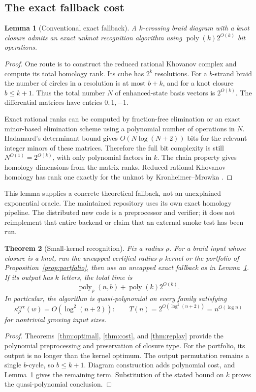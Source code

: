 \documentclass[11pt,a4paper]{article}
\newtheorem{theorem}{Theorem}[section]
\newtheorem{lemma}[theorem]{Lemma}
\theoremstyle{definition}\newtheorem{definition}[theorem]{Definition}
\theoremstyle{remark}\newtheorem{remark}[theorem]{Remark}
\newcommand{\kc}[1]{\kappa^{\mathrm{cyc}}_{#1}}
\begin{document}
\subsection{The exact fallback cost}
\begin{lemma}[Conventional exact fallback]\label{lem:fallback}
A $k$-crossing braid diagram with a knot closure admits an exact unknot
recognition algorithm using $\operatorname{poly}(k)2^{O(k)}$ bit operations.
\end{lemma}
\begin{proof}
One route is to construct the reduced rational Khovanov complex and compute
its total homology rank. Its cube has $2^k$ resolutions. For a $b$-strand
braid the number of circles in a resolution is at most $b+k$, and for a
knot closure $b\le k+1$. Thus the total number $N$ of enhanced-state basis
vectors is $2^{O(k)}$. The differential matrices have entries $0,1,-1$.

Exact rational ranks can be computed by fraction-free elimination or an
exact minor-based elimination scheme using a polynomial number of
operations in $N$. Hadamard's determinant bound gives
$O(N\log(N+2))$ bits for the relevant integer minors of these matrices.
Therefore the full bit complexity is still $N^{O(1)}=2^{O(k)}$, with only
polynomial factors in $k$. The chain property gives homology dimensions
from the matrix ranks. Reduced rational Khovanov homology has rank one
exactly for the unknot by Kronheimer--Mrowka \cite{KM2011}.
\end{proof}

This lemma supplies a concrete theoretical fallback, not an unexplained
exponential oracle. The maintained repository uses its own exact homology
pipeline. The distributed new code is a preprocessor and verifier; it does
not reimplement that entire backend or claim that an external smoke test
has been run.

\begin{theorem}[Small-kernel recognition]\label{thm:recognition}
Fix a radius $\rho$. For a braid input whose closure is a knot, run the
uncapped certified radius-$\rho$ kernel or the portfolio of
Proposition~\ref{prop:portfolio}, then use an uncapped exact fallback as in
Lemma~\ref{lem:fallback}. If its output has $k$ letters, the total time is
\[
 \operatorname{poly}_{\rho}(n,b)+\operatorname{poly}(k)2^{O(k)}.
\]
In particular, the algorithm is quasi-polynomial on every family satisfying
\[
 \kc{\rho}(w)=O(\log^2(n+2)):
 \qquad T(n)=2^{O(\log^2(n+2))}=n^{O(\log n)}
\]
for nontrivial growing input sizes.
\end{theorem}
\begin{proof}
Theorems~\ref{thm:optimal}, \ref{thm:cost}, and \ref{thm:replay}
provide the polynomial preprocessing and preservation of closure type.
For the portfolio, its output is no longer than the kernel optimum.
The output permutation remains a single $b$-cycle, so $b\le k+1$.
Diagram construction adds polynomial cost, and Lemma~\ref{lem:fallback}
gives the remaining term. Substitution of the stated bound on $k$ proves
the quasi-polynomial conclusion.
\end{proof}
\end{document}
